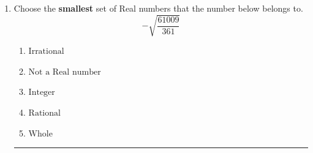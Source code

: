 \documentclass[14pt]{extbook}
\newcommand{\litem}[1]{\item#1\hspace*{-1cm}\rule{\textwidth}{0.4pt}}
\begin{document}
\begin{enumerate}
{\begin{enumerate}[label=\Alph*.]
\end{enumerate} }
\litem{
Choose the \textbf{smallest} set of Real numbers that the number below belongs to.\[ -\sqrt{\frac{61009}{361}} \]\begin{enumerate}[label=\Alph*.]
\item \( \text{Irrational} \)
\item \( \text{Not a Real number} \)
\item \( \text{Integer} \)
\item \( \text{Rational} \)
\item \( \text{Whole} \)

\end{enumerate} }
\end{enumerate}
\end{document}
